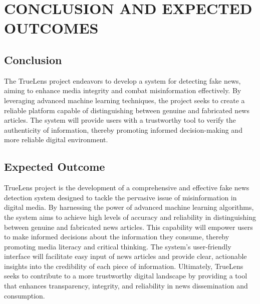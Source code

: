 \chapter{CONCLUSION AND EXPECTED OUTCOMES}
\section{Conclusion}
The TrueLens project endeavors to develop a system for detecting fake news, aiming to enhance media integrity and combat misinformation effectively. By leveraging advanced machine learning techniques, the project seeks to create a reliable platform capable of distinguishing between genuine and fabricated news articles. The system will provide users with a trustworthy tool to verify the authenticity of information, thereby promoting informed decision-making and more reliable digital environment.

\section{Expected Outcome}
TrueLens project is the development of a comprehensive and effective fake news detection system designed to tackle the pervasive issue of misinformation in digital media. By harnessing the power of advanced machine learning algorithms, the system aims to achieve high levels of accuracy and reliability in distinguishing between genuine and fabricated news articles. This capability will empower users to make informed decisions about the information they consume, thereby promoting media literacy and critical thinking. The system's user-friendly interface will facilitate easy input of news articles and provide clear, actionable insights into the credibility of each piece of information. Ultimately, TrueLens seeks to contribute to a more trustworthy digital landscape by providing a tool that enhances transparency, integrity, and reliability in news dissemination and consumption.